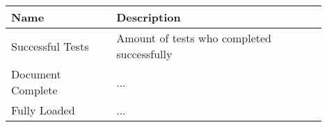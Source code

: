 
\begin{center}
	\small
	\begin{longtable}{ p{0.3\linewidth} | p{0.6\linewidth} }
	Name & Description \\ 
	\hline
	Successful Tests & Amount of tests who completed successfully  \\
	
	Document Complete & ...  \\ %
	
	Fully Loaded & ...  \\ %
	

\end{longtable}
\end{center}
